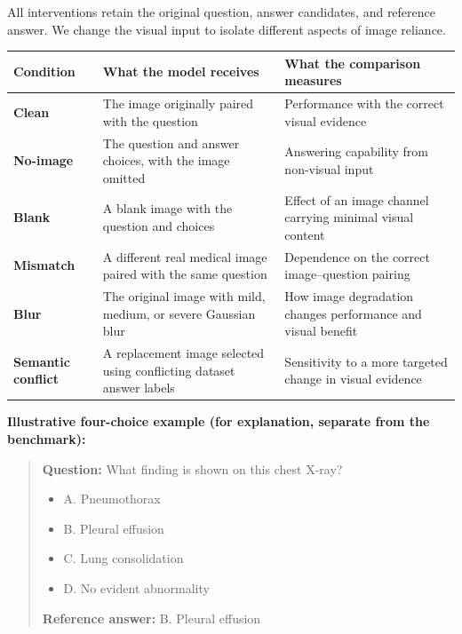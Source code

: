 \documentclass[
  10pt,
  a4paper,
]{article}
\newcounter{none} %
\providecommand{\tightlist}{%
  \setlength{\itemsep}{0pt}\setlength{\parskip}{0pt}}
\begin{document}
All interventions retain the original question, answer candidates, and
reference answer. We change the visual input to isolate different
aspects of image reliance.

{\def\LTcaptype{none} %
\begin{longtable}[]{@{}
  >{\raggedright\arraybackslash}p{}
  >{\raggedright\arraybackslash}p{}
  >{\raggedright\arraybackslash}p{}@{}}
\toprule\noalign{}
\begin{minipage}[b]{\linewidth}\raggedright
Condition
\end{minipage} & \begin{minipage}[b]{\linewidth}\raggedright
What the model receives
\end{minipage} & \begin{minipage}[b]{\linewidth}\raggedright
What the comparison measures
\end{minipage} \\
\midrule\noalign{}
\endhead
\bottomrule\noalign{}
\endlastfoot
\textbf{Clean} & The image originally paired with the question &
Performance with the correct visual evidence \\
\textbf{No-image} & The question and answer choices, with the image
omitted & Answering capability from non-visual input \\
\textbf{Blank} & A blank image with the question and choices & Effect of
an image channel carrying minimal visual content \\
\textbf{Mismatch} & A different real medical image paired with the same
question & Dependence on the correct image--question pairing \\
\textbf{Blur} & The original image with mild, medium, or severe Gaussian
blur & How image degradation changes performance and visual benefit \\
\textbf{Semantic conflict} & A replacement image selected using
conflicting dataset answer labels & Sensitivity to a more targeted
change in visual evidence \\
\end{longtable}
}

\textbf{Illustrative four-choice example (for explanation, separate from
the benchmark):}

\begin{quote}
\textbf{Question:} What finding is shown on this chest X-ray?

\begin{itemize}
\tightlist
\item
  A. Pneumothorax
\item
  B. Pleural effusion
\item
  C. Lung consolidation
\item
  D. No evident abnormality
\end{itemize}

\textbf{Reference answer:} B. Pleural effusion
\end{quote}
\end{document}
